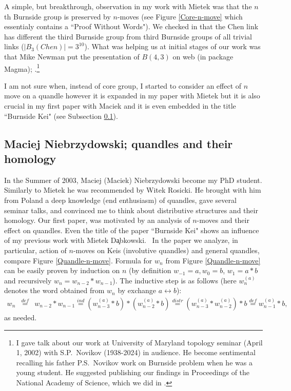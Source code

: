 \documentclass[12pt]{amsart}
\begin{document}
A simple, but breakthrough, observation in my work with Mietek was that the $n$th Burnside group is preserved by $n$-moves (see Figure \ref{Core-n-move} which essentialy contains a ``Proof Without Words"). We checked in \cite{DaPr1} that the Chen link has different the third Burnside group from third Burnside groups of all trivial links ($|B_3(Chen)|=3^{10}$). What was helping us at initial stages of our work was that Mike Newman put the presentation of $B(4,3)$ on web (in package Magma); \cite{New}.\footnote{I gave talk about our work at University of Maryland topology seminar (April 1, 2002) with S.P.~Novikov (1938-2024) in audience. He become sentimental recalling his father P.S.~Novikov work on Burnside problem when he was a young student. He suggested  publishing our findings in Proceedings of the National Academy of Science, which we did in \cite{DaPr2}.}

I am not sure when, instead of core group, I started to consider an effect of $n$ move on a quandle however 
it is expanded in my paper with Mietek \cite{DaPr3} but it is also crucial in my first paper with Maciek and it is even embedded in the title ``Burnside Kei" \cite{NiPr1} (see Subsection \ref{Maciek}).

\subsection{Maciej Niebrzydowski; quandles and their homology}\label{Maciek}
In the Summer of 2003, Maciej (Maciek) Niebrzydowski become my PhD student. Similarly to Mietek he was recommended by Witek Rosicki. He brought with him from 
Poland a deep knowledge (end enthusiasm) of quandles, gave several seminar talks, and convinced me to think about distributive structures and their homology. Our first paper, \cite{NiPr1} was motivated by an analysis of $n$-moves and their effect on quandles. Even  the title of the paper ``Burnside Kei" shows an influence of my previous work with Mietek D{\c a}bkowski. \ 
In the paper we analyze, in particular, action of $n$-moves on Keis (involutive quandles) and general quandles, compare Figure \ref{Quandle-n-move}. Formula for $w_n$ from Figure \ref{Quandle-n-move} can be easily proven by induction on $n$ (by definition $w_{-1}=a, w_0=b$, $w_1=a*b$ and recursively $w_n=w_{n-2}*w_{n-1}$). The inductive step is as follows (here $w_n^{(a)}$ denotes the word obtained from $w_n$ by exchange $a\leftrightarrow b$):
\begin{eqnarray*}
w_n&\stackrel{def}{=}& w_{n-2}*w_{n-1} \stackrel{ind}{=} (w_{n-3}^{(a)}*b)*(w_{n-2}^{(a)}*b) \stackrel{distr}{=}(w_{n-3}^{(a)}*w_{n-2}^{(a)})*b\stackrel{def}{=} w_{n-1}^{(a)}*b, 
\end{eqnarray*}
as needed.
\end{document}
